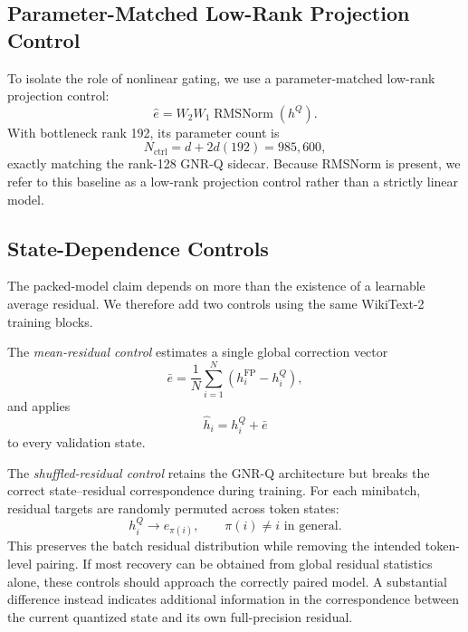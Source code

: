 \documentclass[11pt]{article}
\begin{document}
\subsection{Parameter-Matched Low-Rank Projection Control}

To isolate the role of nonlinear gating, we use a parameter-matched low-rank projection control:
\begin{equation}
 \hat e = W_2W_1\operatorname{RMSNorm}(h^Q).
\end{equation}
With bottleneck rank 192, its parameter count is
\begin{equation}
 N_{\mathrm{ctrl}} = d + 2d(192) = 985{,}600,
\end{equation}
exactly matching the rank-128 GNR-Q sidecar. Because RMSNorm is present, we refer to this baseline as a low-rank projection control rather than a strictly linear model.

\subsection{State-Dependence Controls}

The packed-model claim depends on more than the existence of a learnable average residual. We therefore add two controls using the same WikiText-2 training blocks.

The \emph{mean-residual control} estimates a single global correction vector
\begin{equation}
 \bar e = \frac{1}{N}\sum_{i=1}^{N}
 \left(h_i^{\mathrm{FP}}-h_i^Q\right),
\end{equation}
and applies
\begin{equation}
 \hat h_i = h_i^Q + \bar e
\end{equation}
to every validation state.

The \emph{shuffled-residual control} retains the GNR-Q architecture but breaks the correct state--residual correspondence during training. For each minibatch, residual targets are randomly permuted across token states:
\begin{equation}
 h_i^Q \rightarrow e_{\pi(i)},
 \qquad
 \pi(i)\neq i \text{ in general}.
\end{equation}
This preserves the batch residual distribution while removing the intended token-level pairing. If most recovery can be obtained from global residual statistics alone, these controls should approach the correctly paired model. A substantial difference instead indicates additional information in the correspondence between the current quantized state and its own full-precision residual.
\end{document}
